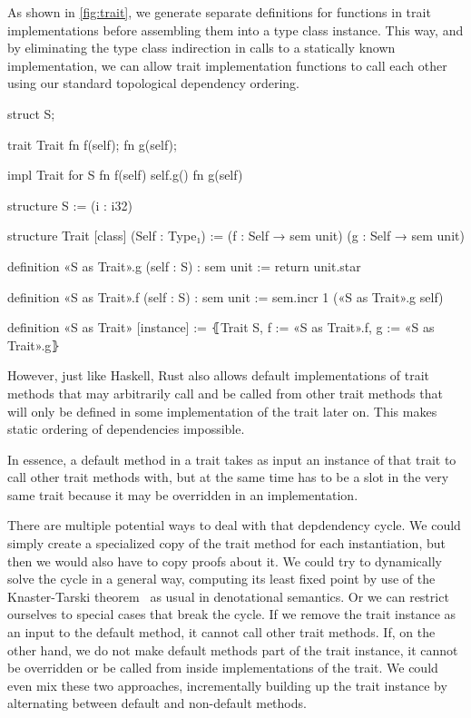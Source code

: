 As shown in \autoref{fig:trait}, we generate separate definitions for functions in trait
implementations before assembling them into a type class instance. This way, and
by eliminating the type class indirection in calls to a statically known
implementation, we can allow trait implementation functions to call each other
using our standard topological dependency ordering.

\begin{sbs1}
struct S;

trait Trait {
  fn f(self);
  fn g(self);
}

impl Trait for S {
  fn f(self) {
    self.g()
  }
  fn g(self) {}
}
\end{sbs1}
\begin{sbs2}
structure S := (i : i32)

structure Trait [class] (Self : Type₁) :=
(f : Self → sem unit)
(g : Self → sem unit)

definition «S as Trait».g (self : S) : sem unit :=
return unit.star

definition «S as Trait».f (self : S) : sem unit :=
sem.incr 1 («S as Trait».g self)

definition «S as Trait» [instance] :=
⦃Trait S, f := «S as Trait».f, g := «S as Trait».g⦄
\end{sbs2}

However, just like Haskell, Rust also allows default implementations of trait
methods that may arbitrarily call and be called from other trait methods that
will only be defined in some implementation of the trait later on. This
makes static ordering of dependencies impossible.

In essence, a default method in a trait takes as input an instance of that trait
to call other trait methods with, but at the same time has to be a slot in the
very same trait because it may be overridden in an implementation.

There are multiple potential ways to deal with that depdendency cycle. We could
simply create a specialized copy of the trait method for each instantiation, but
then we would also have to copy proofs about it. We could try to dynamically solve the cycle in a general way, computing its least fixed point
by use of the Knaster-Tarski theorem~\cite{tarski1955lattice} as usual in
denotational semantics. Or we can restrict ourselves to special cases that break
the cycle. If we remove the trait instance as an input to the default method, it
cannot call other trait methods. If, on the other hand, we do not make default
methods part of the trait instance, it
cannot be overridden or be called from inside implementations of the trait. We
could even mix these two approaches, incrementally building up the
trait instance by alternating between default and non-default methods.

